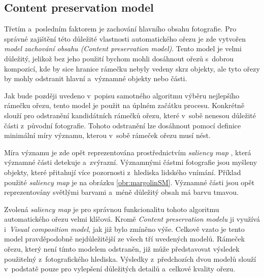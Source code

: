 \subsection{Content preservation model}
Třetím a~posledním faktorem je zachování hlavního obsahu fotografie. Pro správné zajištění této důležité vlastnosti automatického ořezu je zde vytvořen \emph{model zachování obsahu (Content preservation model)}. Tento model je velmi důležitý, jelikož bez jeho použití bychom mohli dosáhnout ořezů s~dobrou kompozicí, kde by sice hranice rámečku nebyly vedeny skrz objekty, ale tyto ořezy by mohly odstranit hlavní a~významné objekty nebo části.

Jak bude později uvedeno v~popisu samotného algoritmu výběru nejlepšího rámečku ořezu, tento model je použit na úplném začátku procesu. Konkrétně slouží pro odstranění kandidátních rámečků ořezu, které v~sobě nenesou důležité části z~původní fotografie. Tohoto odstranění lze dosáhnout pomocí definice minimální míry významu, kterou v~sobě rámeček ořezu musí nést.

Míra významu je zde opět reprezentována prostřednictvím \emph{saliency map} \cite{Margolin2013}, která významné části detekuje a~zvýrazní. Významnými částmi fotografie jsou myšleny objekty, které přitahují více pozornosti z~hlediska lidského vnímání. Příklad použité \emph{saliency map} je na obrázku \ref{obr:margolinSM}. Významné části jsou opět reprezentovány světlými barvami a~méně důležitý obsah má barvu tmavou. 

Zvolená \emph{saliency map} je pro správnou funkcionalitu tohoto algoritmu automatického ořezu velmi klíčová. Kromě \emph{Content preservation modelu} ji využívá i~\emph{Visual composition model}, jak již bylo zmíněno výše. Celkově vzato je tento model pravděpodobně nejdůležitější ze všech tří uvedených modelů. Rámeček ořezu, který není tímto modelem odstraněn, již může představovat výsledek použitelný z~fotografického hlediska. Výsledky z~předchozích dvou modelů slouží v~podstatě pouze pro vylepšení důležitých detailů a~celkové kvality ořezu.

